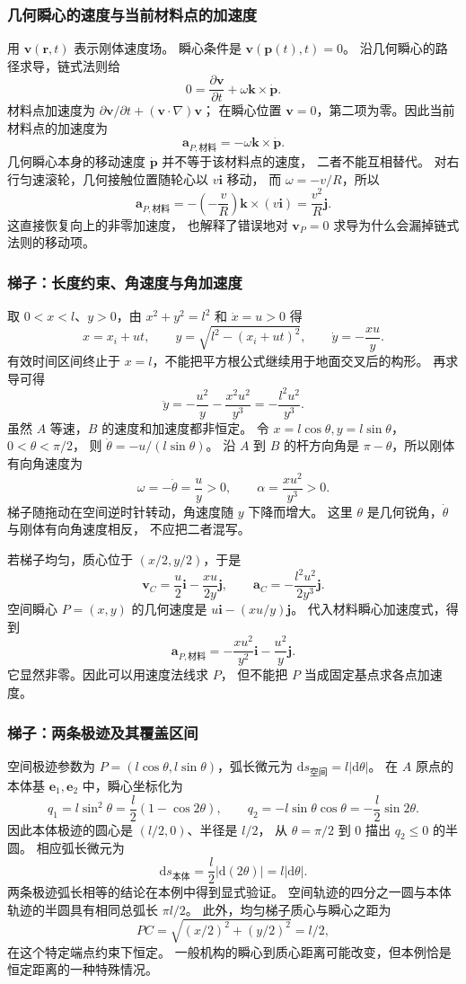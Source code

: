 \documentclass[UTF8,zihao=-4,fontset=fandol,a4paper]{ctexart}
\newcommand{\vect}[1]{\bm{#1}}
\newcommand{\dd}{\mathrm d}
\begin{document}
\subsubsection*{几何瞬心的速度与当前材料点的加速度}
用 $\vect v(\vect r,t)$ 表示刚体速度场。
瞬心条件是 $\vect v(\vect p(t),t)=0$。
沿几何瞬心的路径求导，链式法则给
\[
0=\frac{\partial\vect v}{\partial t}
+\omega\vect k\times\dot{\vect p}.
\]
材料点加速度为
$\partial\vect v/\partial t+(\vect v\cdot\nabla)\vect v$；
在瞬心位置 $\vect v=0$，第二项为零。因此当前材料点的加速度为
\[
\vect a_{P,\text{材料}}=-\omega\vect k\times\dot{\vect p}.
\]
几何瞬心本身的移动速度 $\dot{\vect p}$ 并不等于该材料点的速度，
二者不能互相替代。
对右行匀速滚轮，几何接触位置随轮心以 $v\vect i$ 移动，
而 $\omega=-v/R$，所以
\[
\vect a_{P,\text{材料}}
=-\left(-\frac vR\right)\vect k\times(v\vect i)
=\frac{v^2}{R}\vect j.
\]
这直接恢复向上的非零加速度，
也解释了错误地对 $\vect v_P=0$ 求导为什么会漏掉链式法则的移动项。

\subsubsection*{梯子：长度约束、角速度与角加速度}
取 $0<x<l$、$y>0$，由 $x^2+y^2=l^2$ 和 $\dot x=u>0$ 得
\[
x=x_i+ut,\qquad y=\sqrt{l^2-(x_i+ut)^2},\qquad
\dot y=-\frac{xu}{y}.
\]
有效时间区间终止于 $x=l$，不能把平方根公式继续用于地面交叉后的构形。
再求导可得
\[
\ddot y=-\frac{u^2}{y}-\frac{x^2u^2}{y^3}
=-\frac{l^2u^2}{y^3}.
\]
虽然 $A$ 等速，$B$ 的速度和加速度都非恒定。
令 $x=l\cos\theta,y=l\sin\theta$，$0<\theta<\pi/2$，
则 $\dot\theta=-u/(l\sin\theta)$。
沿 $A$ 到 $B$ 的杆方向角是 $\pi-\theta$，所以刚体有向角速度为
\[
\omega=-\dot\theta=\frac uy>0,
\qquad \alpha=\frac{xu^2}{y^3}>0.
\]
梯子随拖动在空间逆时针转动，角速度随 $y$ 下降而增大。
这里 $\theta$ 是几何锐角，$\dot\theta$ 与刚体有向角速度相反，
不应把二者混写。

若梯子均匀，质心位于 $(x/2,y/2)$，于是
\[
\vect v_C=\frac u2\vect i-\frac{xu}{2y}\vect j,
\qquad
\vect a_C=-\frac{l^2u^2}{2y^3}\vect j.
\]
空间瞬心 $P=(x,y)$ 的几何速度是
$u\vect i-(xu/y)\vect j$。
代入材料瞬心加速度式，得到
\[
\vect a_{P,\text{材料}}
=-\frac{xu^2}{y^2}\vect i-\frac{u^2}{y}\vect j.
\]
它显然非零。因此可以用速度法线求 $P$，
但不能把 $P$ 当成固定基点求各点加速度。

\subsubsection*{梯子：两条极迹及其覆盖区间}
空间极迹参数为 $P=(l\cos\theta,l\sin\theta)$，弧长微元为
$\dd s_{\text{空间}}=l|\dd\theta|$。
在 $A$ 原点的本体基 $\vect e_1,\vect e_2$ 中，瞬心坐标化为
\[
q_1=l\sin^2\theta=\frac l2(1-\cos2\theta),\qquad
q_2=-l\sin\theta\cos\theta=-\frac l2\sin2\theta.
\]
因此本体极迹的圆心是 $(l/2,0)$、半径是 $l/2$，
从 $\theta=\pi/2$ 到 $0$ 描出 $q_2\le0$ 的半圆。
相应弧长微元为
\[
\dd s_{\text{本体}}=\frac l2|\dd(2\theta)|=l|\dd\theta|.
\]
两条极迹弧长相等的结论在本例中得到显式验证。
空间轨迹的四分之一圆与本体轨迹的半圆具有相同总弧长 $\pi l/2$。
此外，均匀梯子质心与瞬心之距为
\[
PC=\sqrt{(x/2)^2+(y/2)^2}=l/2,
\]
在这个特定端点约束下恒定。
一般机构的瞬心到质心距离可能改变，但本例恰是恒定距离的一种特殊情况。
\end{document}
